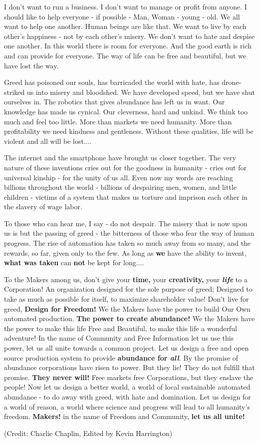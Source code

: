 \documentclass{article}
\begin{document}
{\fontsize{15pt}{15pt}\selectfont
I don't want to run a business. I don't want to manage or profit from
anyone. I should like to help everyone - if possible - Man, Woman -
young - old. We all want to help one another. Human beings are like
that. We want to live by each other's happiness - not by each other's
misery. We don't want to hate and despise one another. In this world
there is room for everyone. And the good earth is rich and can provide
for everyone. The way of life can be free and beautiful, but we have
lost the way.

Greed has poisoned our souls, has barricaded the world with hate, has
drone-striked us into misery and bloodshed. We have developed speed, but
we have shut ourselves in. The robotics that gives abundance has left us in
want. Our knowledge has made us cynical. Our cleverness, hard and
unkind. We think too much and feel too little. More than markets we need
humanity. More than profitability we need kindness and gentleness.
Without these qualities, life will be violent and all will be lost....

The internet and the smartphone have brought us closer together. The
very nature of these inventions cries out for the goodness in humanity -
cries out for universal kinship - for the unity of us all. Even now my
words are reaching billions throughout the world - billions of
despairing men, women, and little children - victims of a system that
makes us torture and imprison each other in the slavery of wage labor.

To those who can hear me, I say - do not despair. The misery that is now
upon us is but the passing of greed - the bitterness of those who fear
the way of human progress. The rise of automation has taken so much away
from so many, and the rewards, so far, given only to the few. As long as
\textbf{we} have the ability to invent, \textbf{what was taken} can
\textbf{not} be kept for long....

To the Makers among us, don't give your \textbf{time,} your
\textbf{creativity,} your \emph{\textbf{life}} to a Corporation! An
organization designed for the sole purpose of greed; Designed to take as
much as possible for itself, to maximize shareholder value! Don't live
for greed, \textbf{Design for Freedom!} We the Makers have the power to
build Our Own automated production. \textbf{The power to create
	abundance!} We the Makers have the power to make this life Free and
Beautiful, to make this life a wonderful adventure! In the name of
Community and Free Information let us use this power, let us all unite
towards a common project. Let us design a free and open source
production system to provide \textbf{abundance for \emph{all}}\emph{.}
By the promise of abundance corporations have risen to power. But they
lie! They do not fulfill that promise. \textbf{They never will!} Free
markets free Corporations, but they enslave the people! Now let us
design a better world, a world of local sustainable automated abundance
- to do away with greed, with hate and domination. Let us design for a
world of reason, a world where science and progress will lead to all
humanity's freedom. \textbf{Makers!} in the name of Freedom and
Community, \textbf{let us all unite!}

(Credit: Charlie Chaplin, Edited by Kevin Harrington)

}
\end{document}
